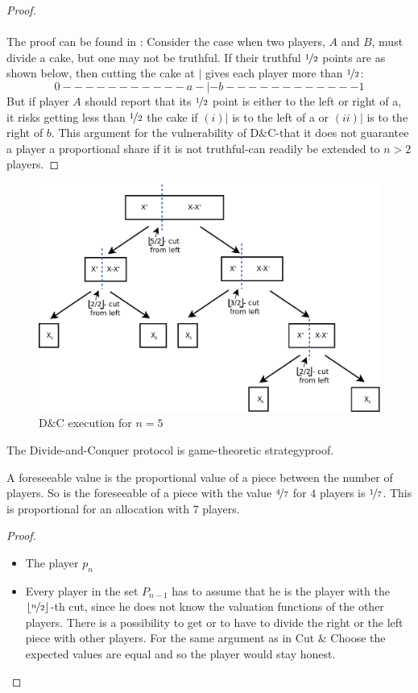 \begin{proof} 
\textcolor{white}{x}\\\\
The proof can be found in \cite{dc}: Consider the case when two players, $A$ and $B$, must divide a 
cake, but one may not be truthful.  If their truthful $\nicefrac{1}{2}$ points are as shown below, then 
cutting the cake at $|$ gives each player more than $\nicefrac{1}{2}$: 
$$0-----------a-|-b------------1$$ 
But if player $A$ should report that its $\nicefrac{1}{2}$ point is either to the left or right of a, it risks 
getting less than $\nicefrac{1}{2}$ the cake if $(i) |$ is to the left of a or $(ii) |$ is to the right of $b$.  This argument for the vulnerability of D$\&$C-that it does not guarantee a player a proportional 
share if it is not truthful-can readily be extended to $n > 2$ players.
\end{proof}
\begin{figure}[h!]
		\centering
 		 \includegraphics[width=380pt]{bilder/dcbsp.pdf}
   \caption{D$\&$C execution for $n=5$}
  	 \end{figure}
\begin{lem}
\label{dc2}
The Divide-and-Conquer protocol is game-theoretic strategyproof.
\end{lem}
A foreseeable value is the proportional value of a piece between the number of players. So is the foreseeable of a piece with the value $\nicefrac{4}{7}$ for $4$ players is $\nicefrac{1}{7}$. This is proportional for an allocation with $7$ players.
\begin{proof}
\begin{itemize}
\item The player $p_n$\\
\item Every player in the set $P_{n-1}$ has to assume that he is the player with the $\lfloor\nicefrac{n}{2}\rfloor$-th cut, since he does not know the valuation functions of the other players. There is a possibility to get or to have to divide the right or the left piece with other players. For the same argument as in Cut $\&$ Choose the expected values are equal and so the player would stay honest.
\end{itemize}
\end{proof}

